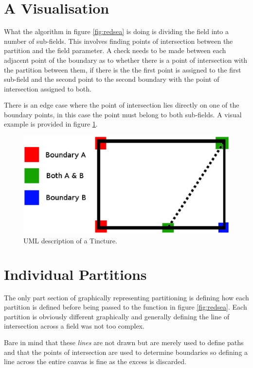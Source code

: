 \section{A Visualisation}

What the algorithm in figure \ref{fig:redsea} is doing is dividing the field into a number of sub-fields.  This involves finding points of intersection between the partition and the field parameter.  A check needs to be made between each adjacent point of the boundary as to whether there is a point of intersection with the partition between them, if there is the the first point is assigned to the first sub-field and the second point to the second boundary with the point of intersection assigned to both. 

There  is an edge case where the point of intersection lies directly on one of the boundary points, in this case the point must belong to both sub-fields.  A visual example is provided in figure \ref{fig:bounds}.


\begin{figure}[H]
  \centering
    \includegraphics[width=\textwidth]{graphics/images/bounds.eps}
  \caption{UML description of a Tincture.}
  \label{fig:bounds}
  
\end{figure}

\section{Individual Partitions}
The only part section of graphically representing partitioning is defining how each partition is defined before being passed to the function in figure \ref{fig:redsea}.  Each partition is obviously different graphically and generally defining the line of intersection across a field was not too complex.

Bare in mind that these \emph{lines} are not drawn but are merely used to define paths and that the points of intersection are used to determine boundaries so defining a line across the entire canvas is fine as the excess is discarded. 


